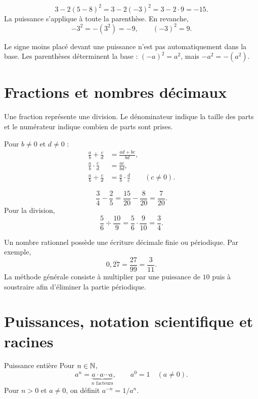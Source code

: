\begin{examplebox}
\[
3-2(5-8)^2=3-2(-3)^2=3-2\cdot9=-15.
\]
La puissance s'applique à toute la parenthèse. En revanche,
\[
-3^2=-(3^2)=-9,\qquad (-3)^2=9.
\]
\end{examplebox}

\begin{warningbox}
Le signe moins placé devant une puissance n'est pas automatiquement dans la base. Les parenthèses déterminent la base : $(-a)^2=a^2$, mais $-a^2=-(a^2)$.
\end{warningbox}

\section{Fractions et nombres décimaux}
\label{manual:section:01.03}

\begin{intuitionbox}
Une fraction représente une division. Le dénominateur indique la taille des parts et le numérateur indique combien de parts sont prises.
\end{intuitionbox}

Pour $b\neq0$ et $d\neq0$ :
\begin{align*}
\frac ab+\frac cd&=\frac{ad+bc}{bd},\\
\frac ab\cdot\frac cd&=\frac{ac}{bd},\\
\frac ab\div\frac cd&=\frac ab\cdot\frac dc\qquad(c\neq0).
\end{align*}

\begin{examplebox}
\[
\frac34-\frac25=\frac{15}{20}-\frac8{20}=\frac7{20}.
\]
Pour la division,
\[
\frac56\div\frac{10}{9}=\frac56\cdot\frac9{10}=\frac34.
\]
\end{examplebox}

Un nombre rationnel possède une écriture décimale finie ou périodique. Par exemple,
\[
0{,}\overline{27}=\frac{27}{99}=\frac3{11}.
\]
La méthode générale consiste à multiplier par une puissance de $10$ puis à soustraire afin d'éliminer la partie périodique.

\section{Puissances, notation scientifique et racines}
\label{manual:section:01.04}

\begin{definition}{Puissance entière}{}
Pour $n\in\mathbb{N}$,
\[
a^n=\underbrace{a\cdot a\cdots a}_{n\text{ facteurs}},\qquad a^0=1\quad(a\neq0).
\]
Pour \(n>0\) et \(a\ne0\), on définit \(a^{-n}=1/a^n\).
\end{definition}

